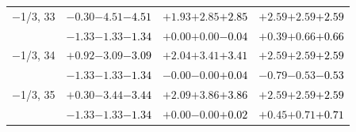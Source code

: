 \documentclass[compress]{beamer}
\begin{document}
\begin{frame}
\begin{tabular}{r | c | c | c}
$-$1/3, 33 & $-0.30$\hspace{0.1 cm}$-4.51$\hspace{0.1 cm}\textcolor{black}{$-4.51$} & $+1.93$\hspace{0.1 cm}$+2.85$\hspace{0.1 cm}\textcolor{black}{$+2.85$} & $+2.59$\hspace{0.1 cm}$+2.59$\hspace{0.1 cm}\textcolor{black}{$+2.59$} \\
           & $-1.33$\hspace{0.1 cm}$-1.33$\hspace{0.1 cm}\textcolor{black}{$-1.34$} & $+0.00$\hspace{0.1 cm}$+0.00$\hspace{0.1 cm}\textcolor{black}{$-0.04$} & $+0.39$\hspace{0.1 cm}$+0.66$\hspace{0.1 cm}\textcolor{black}{$+0.66$} \\
$-$1/3, 34 & $+0.92$\hspace{0.1 cm}$-3.09$\hspace{0.1 cm}\textcolor{black}{$-3.09$} & $+2.04$\hspace{0.1 cm}$+3.41$\hspace{0.1 cm}\textcolor{black}{$+3.41$} & $+2.59$\hspace{0.1 cm}$+2.59$\hspace{0.1 cm}\textcolor{black}{$+2.59$} \\
           & $-1.33$\hspace{0.1 cm}$-1.33$\hspace{0.1 cm}\textcolor{black}{$-1.34$} & $-0.00$\hspace{0.1 cm}$-0.00$\hspace{0.1 cm}\textcolor{black}{$+0.04$} & $-0.79$\hspace{0.1 cm}$-0.53$\hspace{0.1 cm}\textcolor{black}{$-0.53$} \\
$-$1/3, 35 & $+0.30$\hspace{0.1 cm}$-3.44$\hspace{0.1 cm}\textcolor{black}{$-3.44$} & $+2.09$\hspace{0.1 cm}$+3.86$\hspace{0.1 cm}\textcolor{black}{$+3.86$} & $+2.59$\hspace{0.1 cm}$+2.59$\hspace{0.1 cm}\textcolor{black}{$+2.59$} \\
           & $-1.33$\hspace{0.1 cm}$-1.33$\hspace{0.1 cm}\textcolor{black}{$-1.34$} & $+0.00$\hspace{0.1 cm}$-0.00$\hspace{0.1 cm}\textcolor{black}{$+0.02$} & $+0.45$\hspace{0.1 cm}$+0.71$\hspace{0.1 cm}\textcolor{black}{$+0.71$} \\

\end{tabular}
\end{frame}
\end{document}
